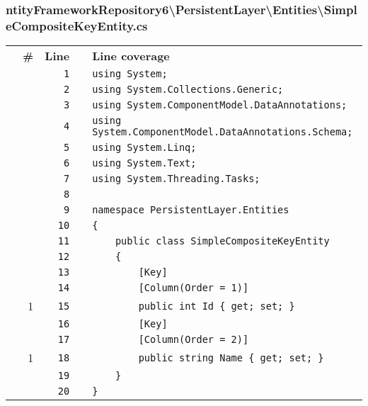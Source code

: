 \documentclass[a4paper,10pt]{article}
\begin{document}
\subsubsection{ntityFrameworkRepository6\textbackslash PersistentLayer\textbackslash Entities\textbackslash SimpleCompositeKeyEntity.cs}
\begin{longtable}[l]{lrrll}
\textbf{} & \textbf{\#} & \textbf{Line} & \textbf{} & \textbf{Line coverage}\\
\cellcolor{gray} &  & \verb~1~ & & \verb~using System;~\\
\cellcolor{gray} &  & \verb~2~ & & \verb~using System.Collections.Generic;~\\
\cellcolor{gray} &  & \verb~3~ & & \verb~using System.ComponentModel.DataAnnotations;~\\
\cellcolor{gray} &  & \verb~4~ & & \verb~using System.ComponentModel.DataAnnotations.Schema;~\\
\cellcolor{gray} &  & \verb~5~ & & \verb~using System.Linq;~\\
\cellcolor{gray} &  & \verb~6~ & & \verb~using System.Text;~\\
\cellcolor{gray} &  & \verb~7~ & & \verb~using System.Threading.Tasks;~\\
\cellcolor{gray} &  & \verb~8~ & & \verb~~\\
\cellcolor{gray} &  & \verb~9~ & & \verb~namespace PersistentLayer.Entities~\\
\cellcolor{gray} &  & \verb~10~ & & \verb~{~\\
\cellcolor{gray} &  & \verb~11~ & & \verb~    public class SimpleCompositeKeyEntity~\\
\cellcolor{gray} &  & \verb~12~ & & \verb~    {~\\
\cellcolor{gray} &  & \verb~13~ & & \verb~        [Key]~\\
\cellcolor{gray} &  & \verb~14~ & & \verb~        [Column(Order = 1)]~\\
\cellcolor{green} & 1 & \verb~15~ & & \verb~        public int Id { get; set; }~\\
\cellcolor{gray} &  & \verb~16~ & & \verb~        [Key]~\\
\cellcolor{gray} &  & \verb~17~ & & \verb~        [Column(Order = 2)]~\\
\cellcolor{green} & 1 & \verb~18~ & & \verb~        public string Name { get; set; }~\\
\cellcolor{gray} &  & \verb~19~ & & \verb~    }~\\
\cellcolor{gray} &  & \verb~20~ & & \verb~}~\\
\end{longtable}
\newpage
\end{document}
